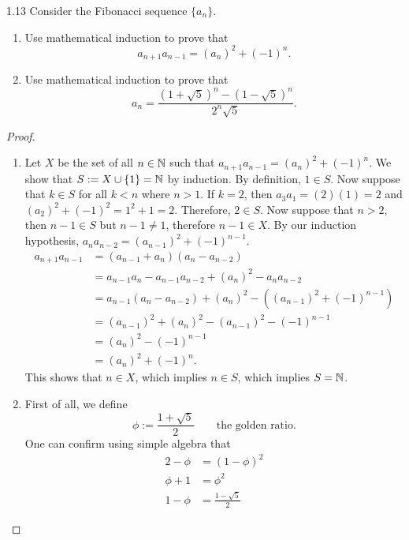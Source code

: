\begin{exercise}{1.13}
    Consider the Fibonacci sequence \(\{a_n\}.\)
    \begin{enumerate}[label=(\alph*)]
        \item Use mathematical induction to prove that \[a_{n+1}a_{n-1} = (a_n)^2 + (-1)^n.\]
        \item Use mathematical induction to prove that \[a_n = \frac{(1+\sqrt{5})^n - (1-\sqrt{5})^n}{2^n\sqrt{5}}.\]
    \end{enumerate}
\end{exercise}
\begin{proof}
\begin{enumerate}[label=(\alph*)]
\item Let \(X\) be the set of all \(n \in \mathbb{N}\) such that \(a_{n+1}a_{n-1} = (a_n)^2 + (-1)^n\).
We show that \(S := X \cup \{1\} = \mathbb{N}\) by induction. By definition, \(1 \in S\). Now suppose that \(k \in S\) for all \(k < n\) where \(n > 1\).
If \(k = 2\), then \(a_3 a_1 = (2)(1) = 2\) and \((a_2)^2 + (-1)^2 = 1^2 + 1 = 2\). Therefore, \(2 \in S\). Now suppose that \(n > 2\),
then \(n-1 \in S\) but \(n-1 \neq 1\), therefore \(n-1 \in X\). By our induction hypothesis, \(a_{n}a_{n-2} = (a_{n-1})^2 + (-1)^{n-1}\).
\begin{align*}
    a_{n+1}a_{n-1} &= (a_{n-1} + a_{n})(a_{n} - a_{n-2})\\
    &= a_{n-1}a_{n} - a_{n-1}a_{n-2} + (a_n)^2 - a_{n}a_{n-2}\\
    &= a_{n-1}(a_n - a_{n-2}) + (a_n)^2 - ((a_{n-1})^2 + (-1)^{n-1})\\
    &= (a_{n-1})^2 + (a_n)^2 - (a_{n-1})^2 - (-1)^{n-1}\\
    &= (a_n)^2 - (-1)^{n-1}\\
    &= (a_n)^2 + (-1)^n.
\end{align*}
This shows that \(n \in X\), which implies \(n \in S\), which implies \(S = \mathbb{N}\).
\item First of all, we define \[\phi := \frac{1+\sqrt{5}}{2} \qquad\text{the golden ratio}.\]
One can confirm using simple algebra that
\begin{align*}
2-\phi &= (1-\phi)^2\\
\phi+1 &= \phi^2\\
1 - \phi &= \frac{1 - \sqrt{5}}{2}
\end{align*}


\end{enumerate}
\end{proof}
